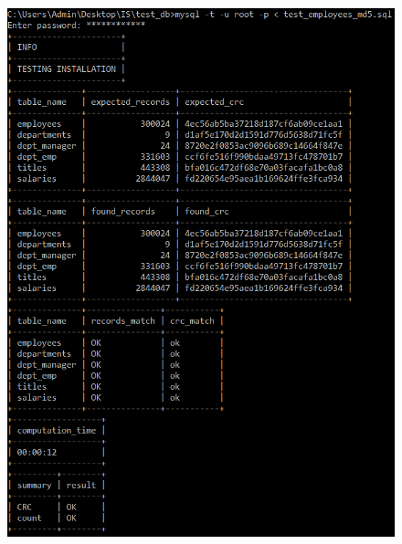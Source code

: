 \documentclass{article}
\begin{document}
\begin{figure}
\centering
\includegraphics[scale = 0.8]{test1.PNG}
\end{figure}
\end{document}
